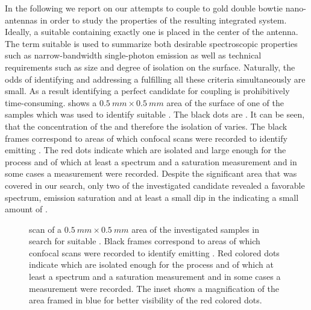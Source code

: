 		In the following we report on our attempts to couple \sivs to gold double bowtie nano-antennas in order to study the properties of the resulting integrated system. Ideally, a suitable \nd containing exactly one \siv is placed in the center of the antenna. The term suitable is used to summarize both desirable spectroscopic properties such as narrow-bandwidth single-photon emission as well as technical requirements such as \nd size and degree of isolation on the surface. Naturally, the odds of identifying and addressing a \nd fulfilling all these criteria simultaneously are small.
		As a result identifying a perfect candidate for coupling is prohibitively time-consuming.
		 shows a $\SI{0.5}{mm}\times\SI{0.5}{mm}$ area of the surface of one of the samples which was used to identify suitable \nds.
		The black dots are \nds.
		It can be seen, that the concentration of the \nds and therefore the isolation of \nds varies.
		The black frames correspond to areas of which confocal scans were recorded to identify \nds emitting \fl.
		The red dots indicate \nds which are isolated and large enough for the \pp process and of which at least a \pl spectrum and a saturation measurement and in some cases a \gt measurement were recorded.
		Despite the significant area that was covered in our search, only two of the investigated candidate \nds revealed a favorable spectrum, emission saturation and at least a small dip in the \gtf indicating a small amount of \sivs. 

		\begin{figure}[htbp]
			\centering
			\caption[LSM scan, overview of a $\SI{0.5}{mm}\times\SI{0.5}{mm}$ area]{\Lsm scan of a $\SI{0.5}{mm}\times\SI{0.5}{mm}$ area of the investigated samples in search for suitable \nds. Black frames correspond to areas of which confocal scans were recorded to identify \nds emitting \fl. Red colored dots indicate \nds which are isolated enough for the \pp process and of which at least a \pl spectrum and a saturation measurement and in some cases a \gt measurement were recorded. The inset shows a magnification of the area framed in blue for better visibility of the red colored dots.}
			\label{fig::milky_way2}
		\end{figure}


